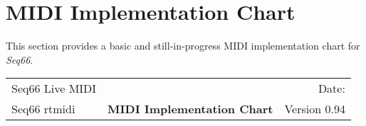 %
%
%

\section{MIDI Implementation Chart}
\label{sec:midi_impl_chart}

   This section provides a basic and still-in-progress MIDI implementation
   chart for \textsl{Seq66}.

   \begin{table}[htb]
      \label{table:midi_impl_chart_top}
      \begin{tabular}{l c r}
         Seq66 Live MIDI &   & Date: \date{\today} \\
         Seq66 rtmidi & \textbf{MIDI Implementation Chart} & Version 0.94 \\
      \end{tabular}
   \end{table}

